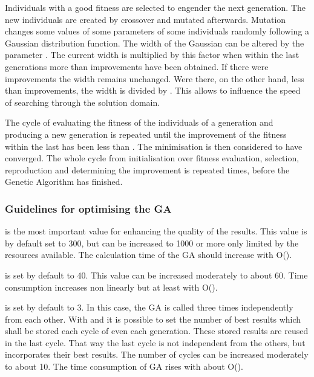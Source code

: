 Individuals with a good fitness are selected to engender the next generation. 
The new individuals are created by crossover and mutated afterwards. Mutation 
changes some values of some parameters of some individuals randomly following
a Gaussian distribution function. The width of the Gaussian can be altered
by the parameter . The current width is multiplied by this factor 
when within the last  generations more than  
improvements have been obtained. If there were  improvements 
the width remains unchanged. Were there, on the other hand, less than 
 improvements, the width is divided by . 
This allows to influence the speed of searching through the solution domain.

The cycle of evaluating the fitness of the individuals of a generation and 
producing a new generation is repeated until the improvement of the fitness 
within the last  has been less than .
The minimisation is then considered to have converged. The whole cycle 
from initialisation over fitness evaluation, selection, reproduction and 
determining the improvement is repeated  times, before the Genetic 
Algorithm has finished.

\subsubsection*{Guidelines for optimising the GA}

 is the most important value for enhancing the quality of the results.
This value is by default set to 300, but can be increased to 1000 or more only limited
by the resources available. The calculation time of the GA should increase with O().

 is set by default to 40. This value can be increased moderately to about 60. 
Time consumption increases non linearly but at least with O(). 

 is set by default to 3. In this case, the GA is called three times independently
from each other. With  and  it is possible to set
the number of best results which shall be stored each cycle of even each generation. 
These stored results are reused in the last cycle. That way the last cycle is not
independent from the others, but incorporates their best results. The number of 
cycles can be increased moderately to about 10. The time consumption of GA rises
with about O().

